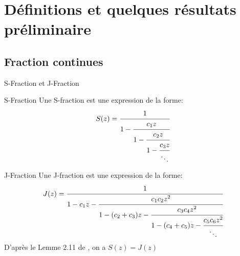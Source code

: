 \section{Définitions et quelques résultats préliminaire}


\subsection{Fraction continues}
\begin{frame}[allowframebreaks]{S-Fraction et J-Fraction}
    \transfade
    \begin{block}{S-Fraction}
        Une S-fraction est une expression de la forme:\\
        \[
			S(z)=\cfrac{1}{1-\cfrac{c_{1}z}{1-\cfrac{c_{2}z}{1-\cfrac{c_{3}z}{\ddots}}}}
		\]
    \end{block}

    \begin{block}{J-Fraction}
        Une J-fraction est une expression de la forme:\\
        \[
			J(z)=\cfrac{1}{1-c_{1}z-\cfrac{c_{1}c_{2}z^2}{1-(c_{2}+c_{3})z-\cfrac{c_{3}c_{4}z^2}{1-(c_{4}+c_{5})z-\cfrac{c_{5}c_{6}z^2}{\ddots}}}}  
		\]
        D'après le Lemme 2.11 de \cite{9}, on a $S(z)=J(z)$
    \end{block}
\end{frame}



